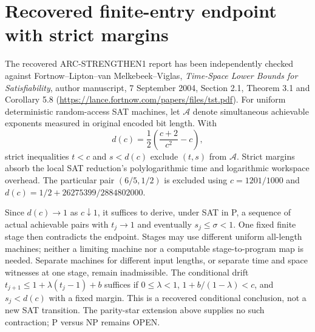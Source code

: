 \section{Recovered finite-entry endpoint with strict margins}
The recovered ARC-STRENGTHEN1 report has been independently checked
against Fortnow--Lipton--van Melkebeek--Viglas,
\emph{Time-Space Lower Bounds for Satisfiability}, author manuscript,
7 September 2004, Section 2.1, Theorem 3.1 and Corollary 5.8
(\url{https://lance.fortnow.com/papers/files/tst.pdf}).
For uniform deterministic random-access SAT machines, let
$\mathcal A$ denote simultaneous achievable exponents measured in
original encoded bit length. With
\[
 d(c)=\frac12\left(\frac{c+2}{c^2}-c\right),
\]
strict inequalities $t<c$ and $s<d(c)$ exclude $(t,s)$ from
$\mathcal A$. Strict margins absorb the local SAT reduction's
polylogarithmic time and logarithmic workspace overhead.
The particular pair $(6/5,1/2)$ is excluded using
$c=1201/1000$ and
$d(c)=1/2+26275399/2884802000$.

Since $d(c)\to1$ as $c\downarrow1$, it suffices to derive, under
SAT in P, a sequence of actual achievable pairs with $t_j\to1$
and eventually $s_j\le\sigma<1$. One fixed finite stage then
contradicts the endpoint. Stages may use different uniform all-length
machines; neither a limiting machine nor a computable stage-to-program
map is needed. Separate machines for different input lengths, or
separate time and space witnesses at one stage, remain inadmissible.
The conditional drift $t_{j+1}\le1+\lambda(t_j-1)+b$ suffices
if $0\le\lambda<1$, $1+b/(1-\lambda)<c$, and $s_j<d(c)$
with a fixed margin. This is a recovered conditional conclusion,
not a new SAT transition. The parity-star extension above supplies
no such contraction; P versus NP remains OPEN.
